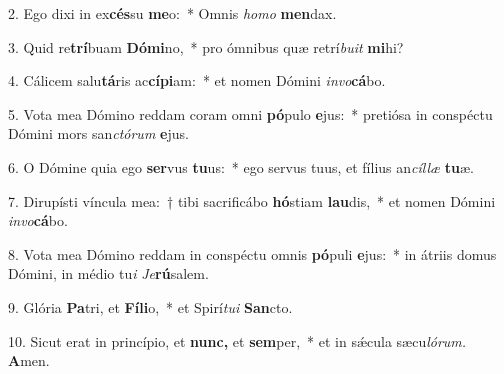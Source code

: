 \item 2. Ego dixi in ex\textbf{cés}su \textbf{me}o:~* Omnis \textit{homo} \textbf{men}dax.
\item 3. Quid re\textbf{trí}buam \textbf{Dó}\textbf{mi}no,~* pro ómnibus quæ retrí\textit{buit} \textbf{mi}hi?
\item 4. Cálicem salu\textbf{tá}ris ac\textbf{cí}\textbf{pi}am:~* et nomen Dómini \textit{invo}\textbf{cá}bo.
\item 5. Vota mea Dómino reddam coram omni \textbf{pó}pulo \textbf{e}jus:~* pretiósa in conspé\-ctu Dómini mors san\textit{ctórum} \textbf{e}jus.
\item 6. O Dómine quia ego \textbf{ser}vus \textbf{tu}us:~* ego servus tuus, et fílius an\textit{cíllæ} \textbf{tu}æ.
\item 7. Dirupísti víncula mea:~† tibi sacrificábo \textbf{hó}stiam \textbf{lau}dis,~* et nomen Dómini \textit{invo}\textbf{cá}bo.
\item 8. Vota mea Dómino reddam in conspéctu omnis \textbf{pó}puli \textbf{e}jus:~* in átriis domus Dómini, in médio tu\hspace{0.03em}\textit{i} \textit{Je}\textbf{rú}salem.
\item 9. Glória \textbf{Pa}tri, et \textbf{Fí}\textbf{li}o,~* et Spirí\hspace{0.03em}\textit{tui} \textbf{San}cto.
\item 10. Sicut erat in princípio, et \textbf{nunc,} et \textbf{sem}per,~* et in sǽcula sæcu\hspace{0.03em}\textit{lórum.} \textbf{A}men.
